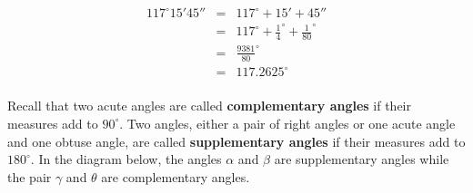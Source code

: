 \documentclass[12pt]{ximera}
\begin{document}
\[ \begin{array}{rcl}

 117^{\circ}15'45'' & = & 117^{\circ} + 15' + 45'' \\ [5pt]
                    & = & 117^{\circ} + \frac{1}{4}^{\circ} + \frac{1}{80}^{\circ} \\ [5pt]
                    & = & \frac{9381}{80}^{\circ} \\ [5pt]
                    & = &  117.2625^{\circ} \\ \end{array} \]

Recall that two acute angles are called \textbf{complementary angles} if their measures add to $90^{\circ}$.  Two angles, either a pair of right angles or one acute angle and one obtuse angle, are called \textbf{supplementary angles} if their measures add to $180^{\circ}$. In the diagram below,  the angles $\alpha$ and $\beta$ are supplementary angles while the pair $\gamma$ and $\theta$ are complementary angles. 

\[ \begin{array}{cc}

 

&

\hspace{1in}

 

\\  \end{array} \]
\end{document}
